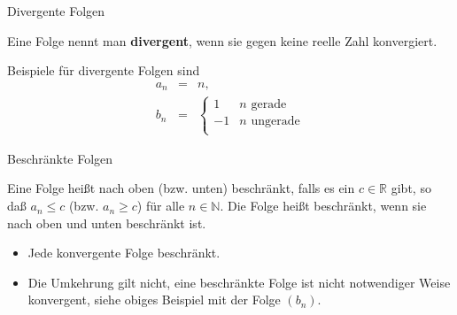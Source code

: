 \documentclass[german]{beamer}
\newcommand{\bq}{\begin{eqnarray*}}
\newcommand{\eq}{\end{eqnarray*}}
\begin{document}
\begin{frame}{Divergente Folgen}

\begin{definition}
Eine Folge nennt man {\bf divergent}, wenn sie gegen keine reelle Zahl konvergiert.
\end{definition}

\begin{example}
Beispiele f\"ur divergente Folgen sind
\bq
 a_n & = & n,
 \nonumber \\
 b_n & = & \left\{\begin{array}{rl}
                   1 & \mbox{$n$ gerade} \\
                  -1 & \mbox{$n$ ungerade} \\
                  \end{array}\right.
\eq
\end{example}

\end{frame}

\begin{frame}{Beschr\"ankte Folgen}

\begin{definition}
Eine Folge hei{\ss}t nach oben (bzw. unten) beschr\"ankt, falls es ein $c\in \mathbb R$ gibt, so da{\ss}
$a_n \le c$ (bzw. $a_n \ge c$) f\"ur alle $n \in \mathbb N$.
Die Folge hei{\ss}t beschr\"ankt, wenn sie nach oben und unten beschr\"ankt ist.
\end{definition}

\begin{itemize}
\item Jede konvergente Folge beschr\"ankt.

\item Die Umkehrung gilt nicht, eine beschr\"ankte Folge ist nicht notwendiger Weise konvergent,
siehe obiges Beispiel mit der Folge $(b_n)$.

\end{itemize}

\end{frame}
\end{document}

